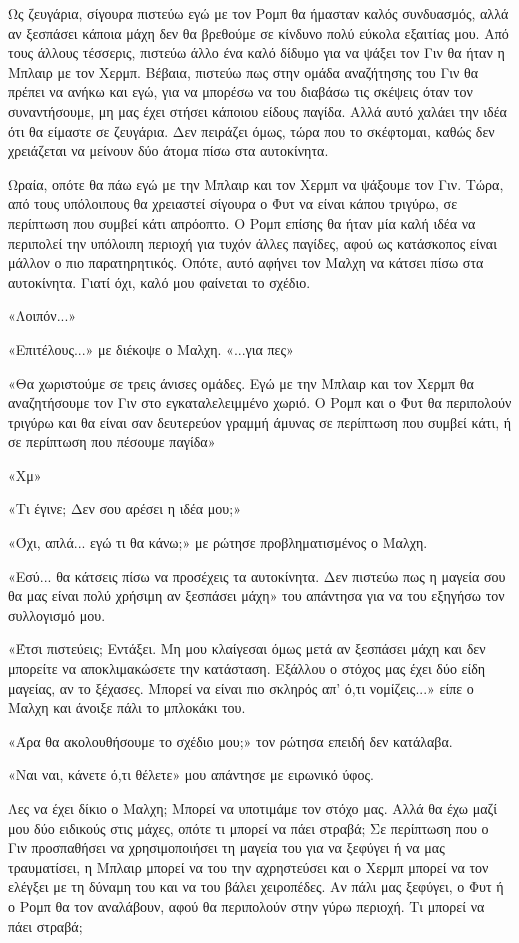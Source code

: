 \documentclass[12pt,twoside, openany]{book}
\begin{document}
Ως ζευγάρια, σίγουρα πιστεύω εγώ με τον Ρομπ θα ήμασταν καλός συνδυασμός, αλλά αν ξεσπάσει κάποια μάχη δεν θα βρεθούμε σε κίνδυνο πολύ εύκολα εξαιτίας μου. Από τους άλλους τέσσερις, πιστεύω άλλο ένα καλό δίδυμο για να ψάξει τον Γιν θα ήταν η Μπλαιρ με τον Χερμπ. Βέβαια, πιστεύω πως στην ομάδα αναζήτησης του Γιν θα πρέπει να ανήκω και εγώ, για να μπορέσω να του διαβάσω τις σκέψεις όταν τον συναντήσουμε, μη μας έχει στήσει κάποιου είδους παγίδα. Αλλά αυτό χαλάει την ιδέα ότι θα είμαστε σε ζευγάρια. Δεν πειράζει όμως, τώρα που το σκέφτομαι, καθώς δεν χρειάζεται να μείνουν δύο άτομα πίσω στα αυτοκίνητα.

Ωραία, οπότε θα πάω εγώ με την Μπλαιρ και τον Χερμπ να ψάξουμε τον Γιν. Τώρα, από τους υπόλοιπους θα χρειαστεί σίγουρα ο Φυτ να είναι κάπου τριγύρω, σε περίπτωση που συμβεί κάτι απρόοπτο. Ο Ρομπ επίσης θα ήταν μία καλή ιδέα να περιπολεί την υπόλοιπη περιοχή για τυχόν άλλες παγίδες, αφού ως κατάσκοπος είναι μάλλον ο πιο παρατηρητικός. Οπότε, αυτό αφήνει τον Μαλχη να κάτσει πίσω στα αυτοκίνητα. Γιατί όχι, καλό μου φαίνεται το σχέδιο.

«Λοιπόν...»

«Επιτέλους...» με διέκοψε ο Μαλχη. «...για πες»

«Θα χωριστούμε σε τρεις άνισες ομάδες. Εγώ με την Μπλαιρ και τον Χερμπ θα αναζητήσουμε τον Γιν στο εγκαταλελειμμένο χωριό. Ο Ρομπ και ο Φυτ θα περιπολούν τριγύρω και θα είναι σαν δευτερεύον γραμμή άμυνας σε περίπτωση που συμβεί κάτι, ή σε περίπτωση που πέσουμε παγίδα»

«Χμ»

«Τι έγινε; Δεν σου αρέσει η ιδέα μου;»

«Όχι, απλά... εγώ τι θα κάνω;» με ρώτησε προβληματισμένος ο Μαλχη.

«Εσύ... θα κάτσεις πίσω να προσέχεις τα αυτοκίνητα. Δεν πιστεύω πως η μαγεία σου θα μας είναι πολύ χρήσιμη αν ξεσπάσει μάχη» του απάντησα για να του εξηγήσω τον συλλογισμό μου.

«Έτσι πιστεύεις; Εντάξει. Μη μου κλαίγεσαι όμως μετά αν ξεσπάσει μάχη και δεν μπορείτε να αποκλιμακώσετε την κατάσταση. Εξάλλου ο στόχος μας έχει δύο είδη μαγείας, αν το ξέχασες. Μπορεί να είναι πιο σκληρός απ’ ό,τι νομίζεις...» είπε ο Μαλχη και άνοιξε πάλι το μπλοκάκι του.

«Άρα θα ακολουθήσουμε το σχέδιο μου;» τον ρώτησα επειδή δεν κατάλαβα.

«Ναι ναι, κάνετε ό,τι θέλετε» μου απάντησε με ειρωνικό ύφος.

Λες να έχει δίκιο ο Μαλχη; Μπορεί να υποτιμάμε τον στόχο μας. Αλλά θα έχω μαζί μου δύο ειδικούς στις μάχες, οπότε τι μπορεί να πάει στραβά; Σε περίπτωση που ο Γιν προσπαθήσει να χρησιμοποιήσει τη μαγεία του για να ξεφύγει ή να μας τραυματίσει, η Μπλαιρ μπορεί να του την αχρηστεύσει και ο Χερμπ μπορεί να τον ελέγξει με τη δύναμη του και να του βάλει χειροπέδες. Αν πάλι μας ξεφύγει, ο Φυτ ή ο Ρομπ θα τον αναλάβουν, αφού θα περιπολούν στην γύρω περιοχή. Τι μπορεί να πάει στραβά;
\end{document}
